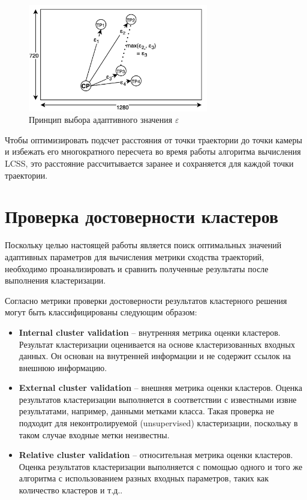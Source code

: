 \begin{figure}[!htb]
	\centering{}
	\includegraphics[width=0.7\textwidth]{images/adaptivity.png}
	\caption{Принцип выбора адаптивного значения $\varepsilon$}
	\label{fig:adaptivity}
\end{figure}

Чтобы оптимизировать подсчет расстояния от точки траектории до точки камеры и избежать его многократного пересчета во время работы алгоритма вычисления LCSS, это расстояние рассчитывается заранее и сохраняется для каждой точки траектории.

\section{Проверка достоверности кластеров}

Поскольку целью настоящей работы является поиск оптимальных значений адаптивных параметров для вычисления метрики сходства траекторий, необходимо проанализировать и сравнить полученные результаты после выполнения кластеризации.

Согласно \cite{online:dunn_cl_valid} метрики проверки достоверности результатов кластерного решения могут быть классифицированы следующим образом:
\begin{itemize}
	\item \textbf{Internal cluster validation} -- внутренняя метрика оценки кластеров. Результат кластеризации оценивается на основе кластеризованных входных данных. Он основан на внутренней информации и не содержит ссылок на внешнюю информацию.
	\item \textbf{External cluster validation} -- внешняя метрика оценки кластеров. Оценка результатов кластеризации выполняется в соответствии с известными извне результатами, например, данными метками класса. Такая проверка не подходит для неконтролируемой (unsupervised) кластеризации, поскольку в таком случае входные метки неизвестны.
	\item \textbf{Relative cluster validation} -- относительная метрика оценки кластеров. Оценка результатов кластеризации выполняется с помощью одного и того же алгоритма с использованием разных входных параметров, таких как количество кластеров и т.д..
\end{itemize}

